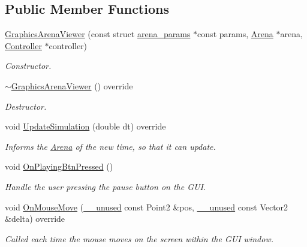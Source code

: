 \subsection*{Public Member Functions}
\begin{DoxyCompactItemize}
\item 
\mbox{\hyperlink{class_graphics_arena_viewer_a869510833897508300da65b1eb0c5d09}{Graphics\+Arena\+Viewer}} (const struct \mbox{\hyperlink{structarena__params}{arena\+\_\+params}} $\ast$const params, \mbox{\hyperlink{class_arena}{Arena}} $\ast$arena, \mbox{\hyperlink{class_controller}{Controller}} $\ast$controller)
\begin{DoxyCompactList}\small\item\em Constructor. \end{DoxyCompactList}\item 
\mbox{\hyperlink{class_graphics_arena_viewer_a88cea02aab1550a7f315fbf4f3868109}{$\sim$\+Graphics\+Arena\+Viewer}} () override
\begin{DoxyCompactList}\small\item\em Destructor. \end{DoxyCompactList}\item 
void \mbox{\hyperlink{class_graphics_arena_viewer_aeec66666382aa0312574d70aa58de250}{Update\+Simulation}} (double dt) override
\begin{DoxyCompactList}\small\item\em Informs the \mbox{\hyperlink{class_arena}{Arena}} of the new time, so that it can update. \end{DoxyCompactList}\item 
void \mbox{\hyperlink{class_graphics_arena_viewer_a7cc65fd0e2e8c1f6138608e398c7c887}{On\+Playing\+Btn\+Pressed}} ()
\begin{DoxyCompactList}\small\item\em Handle the user pressing the pause button on the G\+UI. \end{DoxyCompactList}\item 
void \mbox{\hyperlink{class_graphics_arena_viewer_a74b5c524369a62ba419c89677c646d9e}{On\+Mouse\+Move}} (\mbox{\hyperlink{common_8h_a2e3484535ee610c8e19e9859563abe48}{\+\_\+\+\_\+unused}} const Point2 \&pos, \mbox{\hyperlink{common_8h_a2e3484535ee610c8e19e9859563abe48}{\+\_\+\+\_\+unused}} const Vector2 \&delta) override
\begin{DoxyCompactList}\small\item\em Called each time the mouse moves on the screen within the G\+UI window. \end{DoxyCompactList}\item 

\end{DoxyCompactItemize}
